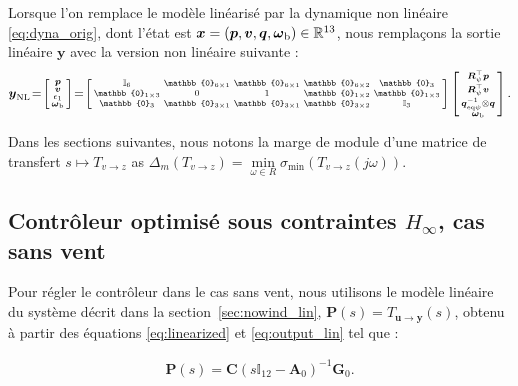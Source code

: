 Lorsque l'on remplace le modèle linéarisé par la dynamique non linéaire \eqref{eq:dyna_orig}, dont l'état est $\boldsymbol{x} = (\boldsymbol{p}, \boldsymbol{v}, \boldsymbol{q},\boldsymbol{\omega}_{\text{b}}) \in {\mathbb R}^{13} $, nous remplaçons la sortie linéaire $\boldsymbol{y}$ avec la version non linéaire suivante :
\begin{align}
\label{eq:output}
    \boldsymbol{y}_{\text{NL}} \!=\! \smallmat{\boldsymbol{p}\\
     \boldsymbol{v}\\
     \epsilon_{1}\\
     \boldsymbol{\omega}_{\text{b}}} \!=\! \left[ \begin{smallmatrix} \mathbb{I}_{6} & \mathbb{0}_{6\times 1} & \mathbb{0}_{6\times 1} & \mathbb{0}_{6\times 2} & \mathbb{0}_{3}\\
     \mathbb{0}_{1\times 3} & 0 & 1 & \mathbb{0}_{1\times 2} & \mathbb{0}_{1 \times 3} \\
         \mathbb{0}_{3} & \mathbb{0}_{3\times 1} & \mathbb{0}_{3\times 1} & \mathbb{0}_{3\times 2} &   \mathbb{I}_{3}
         \end{smallmatrix} \right]
         \smallmat{\boldsymbol{R}^\top_{\psi}\boldsymbol{p} \\ \boldsymbol{R}^\top_{\psi}\boldsymbol{v} \\
\boldsymbol{q}_{\mathrm{eq}\psi}^{-1} \otimes \boldsymbol{q} \\
         \boldsymbol{\omega}_{\text{b}}  }.
\end{align}


Dans les sections suivantes, nous notons la marge de module d'une matrice de transfert $s \mapsto T_{v \rightarrow z}$ as $\Delta_m(T_{v \rightarrow z}) = \min\limits_{\omega\in R} \sigma_{\min}(T_{v \rightarrow z}(j\omega))$.



\subsection{Contrôleur optimisé sous contraintes $H_{\infty}$, cas sans vent}
\label{sec:zerowind}

Pour régler le contrôleur dans le cas sans vent, nous utilisons le modèle linéaire du système décrit dans la section~\ref{sec:nowind_lin}, $\boldsymbol{P}(s) = T_{\boldsymbol{u} \rightarrow \boldsymbol{y}}(s)$, obtenu à partir des équations \eqref{eq:linearized} et \eqref{eq:output_lin} tel que :

\begin{align*}
    \boldsymbol{P}(s) = \boldsymbol{C} (s \mathbb{I}_{12} - \boldsymbol{A}_{0})^{-1} \boldsymbol{G}_{0}.
\end{align*} 


